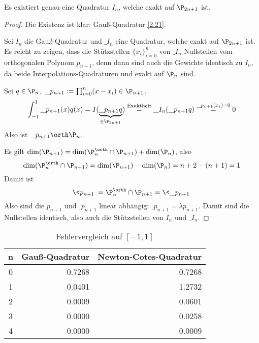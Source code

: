 \documentclass[11pt]{scrartcl}
\begin{document}
\begin{st}
	\label{2.23}
	Es existiert genau eine Quadratur $I_n$, welche exakt auf $\P_{2n+1}$ ist.
	\begin{proof}
		Die Existenz ist klar: Gauß-Quadratur \ref{2.21}.

		Sei $I_n$ die Gauß-Quadratur und $\_{I_n}$ eine Quadratur, welche exakt auf $\P_{2n+1}$ ist.
		Es reicht zu zeigen, dass die Stützstellen $\{x_i\}_{i=0}^n$ von $\_{I_n}$ Nullstellen vom orthogonalen Polynom $p_{n+1}$, denn dann sind auch die Gewichte identisch zu $I_n$, da beide Interpolations-Quadraturen und exakt auf $\P_n$ sind.
	
		Sei $q\in \P_n$, $\_p_{n+1} := \prod_{i=0}^n (x-x_i) \in \P_{n+1}$.
		\[
			\int_{-1}^1 \_p_{n+1}(x) q(x) 
			= I(\underbrace{\_p_{n+1} q}_{\in \P_{2n+1}})
			\stackrel{\text{Exaktheit}}= \_I_n (\_p_{n+1}q)
			\stackrel{\_p_{n+1}(x_i)=0}= 0
		\]
		Also ist $\_p_{n+1} \orth \P_n$.

		Es gilt $\dim(\P_{n+1}) = \dim( \P_n^\orth \cap \P_{n+1}) + \dim (\P_n)$, also
		\[
			\dim( \P_n^\orth \cap \P_{n+1}) = \dim(\P_{n+1}) - \dim(\P_n) = n+2 - (n+1) = 1
		\]
		Damit ist 
		\[
			 \<p_{n+1}\> = \P_n^\orth \cap \P_{n+1} = \<\_p_{n+1}\>
		\]
		Also sind die $p_{n+1}$ und $\_p_{n+1}$ linear abhängig: $\_p_{n+1} = \lambda p_{n+1}$.
		Damit sind die Nullstellen identisch, also auch die Stützstellen von $I_n$ und $\_I_n$.
	\end{proof}
\end{st}

\begin{ex*}[Vergleich von Newton-Cotes und Gauß-Quadratur auf $f(x)=\cos(x\f \pi 2)$ auf]
	\begin{table}[!ht]
		\centering
		\caption{Fehlervergleich auf $[-1,1]$}
		\begin{tabular}{c|r|r}
			n & Gauß-Quadratur & Newton-Cotes-Quadratur \\ \hline
			0 & 0.7268 & 0.7268 \\
			1 & 0.0401 & 1.2732 \\
			2 & 0.0009 & 0.0601 \\
			3 & 0.0000 & 0.0258 \\
			4 & 0.0000 & 0.0009
		\end{tabular}
	\end{table}
\end{ex*}
\end{document}
